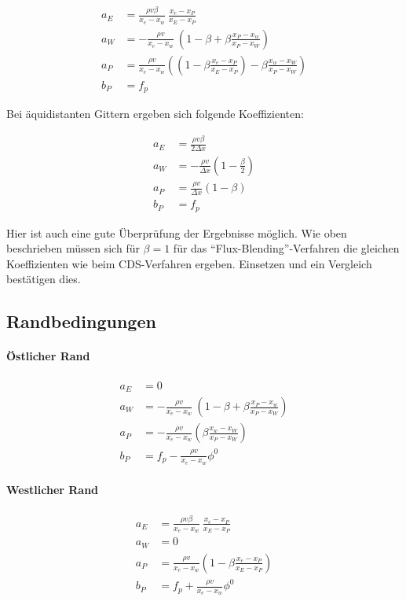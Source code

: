 \documentclass[11pt, ngerman,colorback,accentcolor=tud2d]{tudreport}
\begin{document}
\begin{align*}
  a_E &= \frac{\rho v \beta}{x_e-x_w}\ \frac{x_e-x_P}{x_E-x_P}\\
  a_W &=-\frac{\rho v}{x_e-x_w}\ \left({1-\beta + \beta \frac{x_P-x_w}{x_P-x_W}}\right)\\
  a_P &= \frac{\rho v}{x_e-x_w} \left({
  \left({1-\beta \frac{x_e-x_P}{x_E-x_P}}\right)- \beta \frac{x_w-x_W}{x_P-x_W}
  }\right)\\
  b_P &= f_p
\end{align*}

Bei äquidistanten Gittern ergeben sich folgende Koeffizienten:

\begin{align*}
  a_E &= \frac{\rho v \beta}{2\Delta x}\\
  a_W &=-\frac{\rho v}{\Delta x}\left({1-\frac{\beta}{2} }\right)\\
  a_P &= \frac{\rho v}{\Delta x}(1-\beta)\\
  b_P &= f_p
\end{align*}

Hier ist auch eine gute Überprüfung der Ergebnisse möglich. Wie oben beschrieben
müssen sich für $\beta = 1$ für das ``Flux-Blending''-Verfahren die gleichen
Koeffizienten wie beim CDS-Verfahren ergeben. Einsetzen und ein Vergleich bestätigen dies.

\subsection{Randbedingungen}

\paragraph{Östlicher Rand}

\begin{align*}
  a_E &= 0\\
  a_W &=-\frac{\rho v}{x_e-x_w}\ \left({1-\beta + \beta \frac{x_P-x_w}{x_P-x_W}}\right)\\
  a_P &=-\frac{\rho v}{x_e-x_w} \left({\beta \frac{x_w-x_W}{x_P-x_W}}\right)\\
  b_P &= f_p-\frac{\rho v}{x_e-x_w} \phi^0
\end{align*}


\paragraph{Westlicher Rand}

\begin{align*}
  a_E &= \frac{\rho v \beta}{x_e-x_w}\ \frac{x_e-x_P}{x_E-x_P}\\
  a_W &=0\\
  a_P &= \frac{\rho v}{x_e-x_w} \left({1-\beta \frac{x_e-x_P}{x_E-x_P}}\right)\\
  b_P &= f_p+\frac{\rho v}{x_e-x_w} \phi^0
\end{align*}
\end{document}
